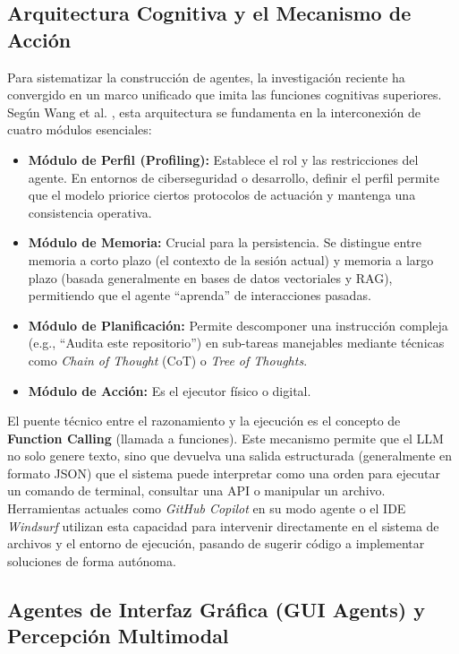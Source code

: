 \subsection{Arquitectura Cognitiva y el Mecanismo de Acción}

Para sistematizar la construcción de agentes, la investigación reciente ha convergido en un marco unificado que imita las funciones cognitivas superiores. Según Wang et al. \cite{wang2025survey}, esta arquitectura se fundamenta en la interconexión de cuatro módulos esenciales:

\begin{itemize}
    \item \textbf{Módulo de Perfil (Profiling):} Establece el rol y las restricciones del agente. En entornos de ciberseguridad o desarrollo, definir el perfil permite que el modelo priorice ciertos protocolos de actuación y mantenga una consistencia operativa.
    \item \textbf{Módulo de Memoria:} Crucial para la persistencia. Se distingue entre memoria a corto plazo (el contexto de la sesión actual) y memoria a largo plazo (basada generalmente en bases de datos vectoriales y RAG), permitiendo que el agente ``aprenda'' de interacciones pasadas. \cite{lewis2020rag}
    \item \textbf{Módulo de Planificación:} Permite descomponer una instrucción compleja (e.g., ``Audita este repositorio'') en sub-tareas manejables mediante técnicas como \textit{Chain of Thought} (CoT) o \textit{Tree of Thoughts}. \cite{wei2022cot}
    \item \textbf{Módulo de Acción:} Es el ejecutor físico o digital. 
\end{itemize}

El puente técnico entre el razonamiento y la ejecución es el concepto de \textbf{Function Calling} (llamada a funciones). Este mecanismo permite que el LLM no solo genere texto, sino que devuelva una salida estructurada (generalmente en formato JSON) que el sistema puede interpretar como una orden para ejecutar un comando de terminal, consultar una API o manipular un archivo. Herramientas actuales como \textit{GitHub Copilot} en su modo agente o el IDE \textit{Windsurf} utilizan esta capacidad para intervenir directamente en el sistema de archivos y el entorno de ejecución, pasando de sugerir código a implementar soluciones de forma autónoma.

\subsection{Agentes de Interfaz Gráfica (GUI Agents) y Percepción Multimodal}

